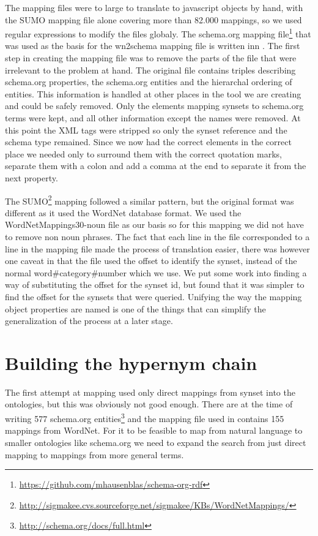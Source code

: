 The mapping files were to large to translate to javascript objects by hand, with the SUMO mapping file alone
covering more than 82.000 mappings, so we used regular expressions to modify the files globaly.
The schema.org mapping file\footnote{\url{https://github.com/mhausenblas/schema-org-rdf}}
that was used as the basis for the wn2schema mapping file is written inn .
The first step in creating the mapping file was to remove the parts of the file that were irrelevant to the problem at hand.
The original file contains triples describing schema.org properties,
the schema.org entities and the hierarchal ordering of entities.
This information is handled at other places in the tool we are creating and could be safely removed.
Only the elements mapping synsets to schema.org terms were kept, and all other information except the names were removed.
At this point the XML tags were stripped so only the synset reference and the schema type remained.
Since we now had the correct elements in the correct place we needed only to surround them with the correct quotation
marks, separate them with a colon and add a comma at the end to separate it from the next property.

The SUMO\footnote{\url{http://sigmakee.cvs.sourceforge.net/sigmakee/KBs/WordNetMappings/}} mapping followed a similar pattern,
but the original format was different as it used the WordNet database format.
We used the WordNetMappings30-noun file as our basis so for this mapping we did not have to remove non noun phrases.
The fact that each line in the file corresponded to a line in the mapping file made the process of translation easier,
there was however one caveat in that the file used the offset to identify the synset,
instead of the normal word\#category\#number which we use.
We put some work into finding a way of substituting the offset for the synset id,
but found that it was simpler to find the offset for the synsets that were queried.
Unifying the way the mapping object properties are named is one of the things that can simplify the generalization of the process at a later stage.



\section{Building the hypernym chain}
The first attempt at mapping used only direct mappings from synset into the ontologies,
but this was obviously not good enough.
There are at the time of writing 577 schema.org entities\footnote{\url{http://schema.org/docs/full.html}}
and the mapping file used in \theartefact contains 155 mappings from WordNet.
For it to be feasible to map from natural language to smaller ontologies like schema.org we need to expand the search
from just direct mapping to mappings from more general terms.

